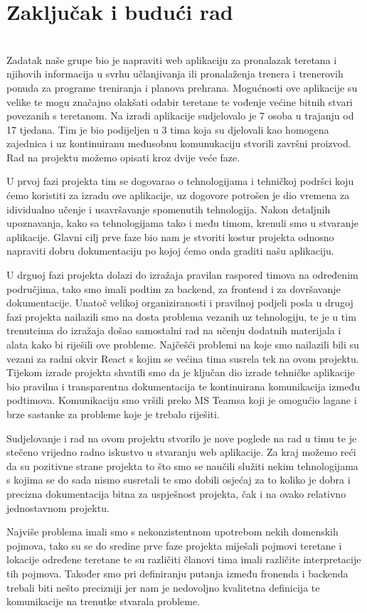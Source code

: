 \chapter{Zaključak i budući rad}
		
		\textbf{}\\
		  Zadatak naše grupe bio je napraviti web aplikaciju za  pronalazak teretana i njihovih informacija u svrhu učlanjivanja ili pronalaženja trenera i trenerovih ponuda za programe treniranja i planova prehrana. Mogućnosti ove aplikacije su velike te mogu značajno olakšati odabir teretane te vođenje većine bitnih stvari povezanih s teretanom. Na izradi aplikacije sudjelovalo je 7 osoba u trajanju od 17 tjedana. Tim je bio podijeljen u 3 tima koja su djelovali kao homogena zajednica i uz kontinuiranu međusobnu komunukaciju stvorili završni proizvod. Rad na projektu možemo opisati kroz dvije veće faze. 
		  
		  U prvoj fazi projekta tim se dogovarao o tehnologijama i tehničkoj podršci koju ćemo koristiti za izradu ove aplikacije, uz dogovore potrošen je dio vremena za idividualno učenje i usavršavanje spomenutih tehnologija. Nakon detaljnih upoznavanja, kako sa tehnologijama tako i među timom, krenuli smo u stvaranje aplikacije. Glavni cilj prve faze bio nam je stvoriti kostur projekta odnosno napraviti dobru dokumentaciju po kojoj ćemo onda graditi našu aplikaciju. 
		  
		  U drguoj fazi projekta dolazi do izražaja pravilan raspored timova na određenim područjima, tako smo imali podtim za backend, za frontend i za dovršavanje dokumentacije. Unatoč velikoj organiziranosti i pravilnoj podjeli posla u drugoj fazi projekta nailazili smo na dosta problema vezanih uz tehnologiju, te je u tim trenutcima do izražaja došao samostalni rad na učenju dodatnih materijala i alata kako bi riješili ove probleme. Najčešći problemi na koje smo nailazili bili su vezani za radni okvir React s kojim se većina tima susrela tek na ovom projektu. Tijekom izrade projekta shvatili smo da je ključan dio izrade tehničke aplikacije bio pravilna i transparentna dokumentacija te kontinuirana komunikacija između podtimova. Komunikaciju smo vršili preko MS Teamsa koji je omogućio lagane i brze sastanke za probleme koje je trebalo riješiti. 
		  
		  Sudjelovanje i rad na ovom projektu stvorilo je nove poglede na rad u timu te je stečeno vrijedno radno iskustvo u stvaranju web aplikacije. Za kraj možemo reći da su pozitivne strane projekta to što smo se naučili služiti nekim tehnologijama s kojima se do sada nismo susretali te smo dobili osjećaj za to koliko je dobra i precizna dokumentacija bitna za uspješnost projekta, čak i na ovako relativno jednostavnom projektu. 
		  
		  Najviše problema imali smo s nekonzistentnom upotrebom nekih domenskih pojmova, tako su se do sredine prve faze projekta miješali pojmovi teretane i lokacije određene teretane te su različiti članovi tima imali različite interpretacije tih pojmova. Također smo pri definiranju putanja između fronenda i backenda trebali biti nešto precizniji jer nam je nedovoljno kvalitetna definicija te komunikacije na trenutke stvarala probleme.
		\eject 
